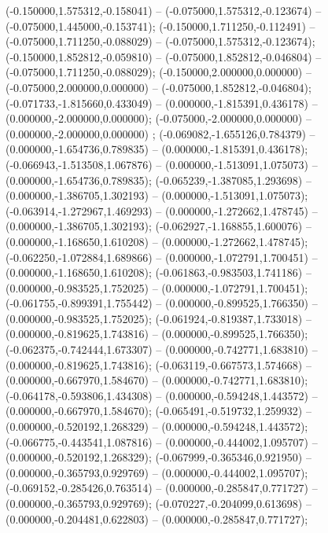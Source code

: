  (-0.150000,1.575312,-0.158041) -- (-0.075000,1.575312,-0.123674) -- (-0.075000,1.445000,-0.153741);
 (-0.150000,1.711250,-0.112491) -- (-0.075000,1.711250,-0.088029) -- (-0.075000,1.575312,-0.123674);
 (-0.150000,1.852812,-0.059810) -- (-0.075000,1.852812,-0.046804) -- (-0.075000,1.711250,-0.088029);
 (-0.150000,2.000000,0.000000) -- (-0.075000,2.000000,0.000000) -- (-0.075000,1.852812,-0.046804);
 (-0.071733,-1.815660,0.433049) -- (0.000000,-1.815391,0.436178) -- (0.000000,-2.000000,0.000000);
 (-0.075000,-2.000000,0.000000) -- (0.000000,-2.000000,0.000000) ;
 (-0.069082,-1.655126,0.784379) -- (0.000000,-1.654736,0.789835) -- (0.000000,-1.815391,0.436178);
 (-0.066943,-1.513508,1.067876) -- (0.000000,-1.513091,1.075073) -- (0.000000,-1.654736,0.789835);
 (-0.065239,-1.387085,1.293698) -- (0.000000,-1.386705,1.302193) -- (0.000000,-1.513091,1.075073);
 (-0.063914,-1.272967,1.469293) -- (0.000000,-1.272662,1.478745) -- (0.000000,-1.386705,1.302193);
 (-0.062927,-1.168855,1.600076) -- (0.000000,-1.168650,1.610208) -- (0.000000,-1.272662,1.478745);
 (-0.062250,-1.072884,1.689866) -- (0.000000,-1.072791,1.700451) -- (0.000000,-1.168650,1.610208);
 (-0.061863,-0.983503,1.741186) -- (0.000000,-0.983525,1.752025) -- (0.000000,-1.072791,1.700451);
 (-0.061755,-0.899391,1.755442) -- (0.000000,-0.899525,1.766350) -- (0.000000,-0.983525,1.752025);
 (-0.061924,-0.819387,1.733018) -- (0.000000,-0.819625,1.743816) -- (0.000000,-0.899525,1.766350);
 (-0.062375,-0.742444,1.673307) -- (0.000000,-0.742771,1.683810) -- (0.000000,-0.819625,1.743816);
 (-0.063119,-0.667573,1.574668) -- (0.000000,-0.667970,1.584670) -- (0.000000,-0.742771,1.683810);
 (-0.064178,-0.593806,1.434308) -- (0.000000,-0.594248,1.443572) -- (0.000000,-0.667970,1.584670);
 (-0.065491,-0.519732,1.259932) -- (0.000000,-0.520192,1.268329) -- (0.000000,-0.594248,1.443572);
 (-0.066775,-0.443541,1.087816) -- (0.000000,-0.444002,1.095707) -- (0.000000,-0.520192,1.268329);
 (-0.067999,-0.365346,0.921950) -- (0.000000,-0.365793,0.929769) -- (0.000000,-0.444002,1.095707);
 (-0.069152,-0.285426,0.763514) -- (0.000000,-0.285847,0.771727) -- (0.000000,-0.365793,0.929769);
 (-0.070227,-0.204099,0.613698) -- (0.000000,-0.204481,0.622803) -- (0.000000,-0.285847,0.771727);
